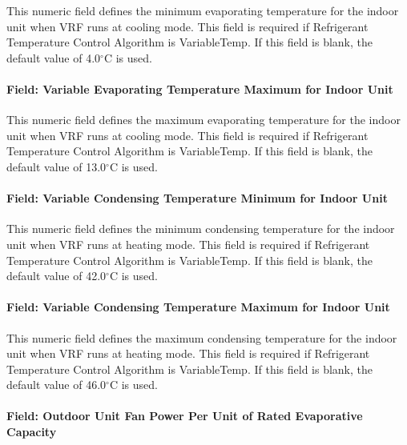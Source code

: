 This numeric field defines the minimum evaporating temperature for the indoor unit when VRF runs at cooling mode. This field is required if Refrigerant Temperature Control Algorithm is VariableTemp. If this field is blank, the default value of 4.0$^\circ$C is used.

\paragraph{Field: Variable Evaporating Temperature Maximum for Indoor Unit}\label{field-variable-evaporating-temperature-maximum-for-indoor-unit}

This numeric field defines the maximum evaporating temperature for the indoor unit when VRF runs at cooling mode. This field is required if Refrigerant Temperature Control Algorithm is VariableTemp. If this field is blank, the default value of 13.0$^\circ$C is used.

\paragraph{Field: Variable Condensing Temperature Minimum for Indoor Unit}\label{field-variable-condensing-temperature-minimum-for-indoor-unit}

This numeric field defines the minimum condensing temperature for the indoor unit when VRF runs at heating mode. This field is required if Refrigerant Temperature Control Algorithm is VariableTemp. If this field is blank, the default value of 42.0$^\circ$C is used.

\paragraph{Field: Variable Condensing Temperature Maximum for Indoor Unit}\label{field-variable-condensing-temperature-maximum-for-indoor-unit}

This numeric field defines the maximum condensing temperature for the indoor unit when VRF runs at heating mode. This field is required if Refrigerant Temperature Control Algorithm is VariableTemp. If this field is blank, the default value of 46.0$^\circ$C is used.

\paragraph{Field: Outdoor Unit Fan Power Per Unit of Rated Evaporative Capacity}\label{field-outdoor-unit-fan-power-per-unit-of-rated-evaporative-capacity}

